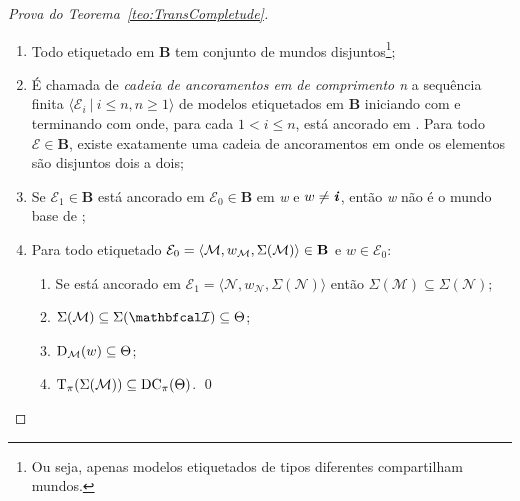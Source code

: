 \begin{apendicesenv}
\begin{proof}[Prova do Teorema~\ref{teo:TransCompletude}]
\begin{lema}
\begin{enumerate}[label=\textnormal{\ref{teo:Lema3}.\arabic*}]
                    \item \textnormal{Todo \PImodelo etiquetado em \textbf{B} tem conjunto de mundos
                        disjuntos\footnote{Ou seja, apenas modelos etiquetados de tipos diferentes compartilham mundos.};}\label{caso:Lema3-3}

                    \item \textnormal{É chamada de \textit{cadeia de ancoramentos em  de comprimento n} a sequência finita \(\langle \mathcal{E}_{i} \ | \ i \leq n, n \geq 1 \rangle\)
                    de modelos etiquetados em \textbf{B} iniciando com \Modeloinicial e terminando com  onde, para cada \(1 < i \leq n\),  está
                    ancorado em . Para todo \(\mathcal{E} \in \mathbf{B}\), existe exatamente uma cadeia de ancoramentos em  onde os elementos são
                    disjuntos dois a dois;}\label{caso:Lema3-4}

                    \item \textnormal{Se \(\mathcal{E}_{1} \in \mathbf{B}\) está ancorado em \(\mathcal{E}_{0} \in \mathbf{B}\) em \textit{w} e \(w \neq \textbf{\textit{i}}\),
                    então \textit{w} não é o mundo base de ;}\label{caso:Lema3-5}

                    \item \textnormal{Para todo \PImodelo etiquetado \(\mathcal{E}_{0} = \langle \mathcal{M}, w_{\mathcal{M}}, \Sigma(\mathcal{M}) \rangle \in \mathbf{B}\) e \(w \in \mathcal{E}_{0}\):}\label{caso:Lema3-6}
                    \begin{enumerate}[label=\textnormal{(\roman*)}]
                        \item \textnormal{Se  está ancorado em \(\mathcal{E}_{1} = \langle \mathcal{N}, w_{\mathcal{N}}, \Sigma(\mathcal{N}) \rangle\)
                            então \(\Sigma(\mathcal{M}) \subseteq \Sigma(\mathcal{N})\);} \label{caso:Lema3-6-1}

                        \item \textnormal{\(\Sigma(\mathcal{M}) \subseteq \Sigma(\mathcal{\modeloinicial}) \subseteq \Theta\);} \label{caso:Lema3-6-2}

                        \item \textnormal{\(\operatorname{D}_{\mathcal{M}}(w) \subseteq \Theta\);} \label{caso:Lema3-6-3}

                        \item \textnormal{\(\operatorname{T}_{\pi}(\Sigma(\mathcal{M})) \subseteq \operatorname{DC}_{\pi}(\Theta)\).} \label{caso:Lema3-6-4} \qed
                    \end{enumerate}
                \end{enumerate}
            \end{lema}


\end{proof}
\end{apendicesenv}

